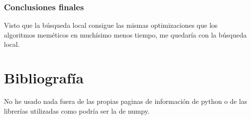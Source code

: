 \documentclass[titlepage]{article}
\begin{document}
	\subsubsection{Conclusiones finales}
	Visto que la búsqueda local consigue las mismas optimizaciones que los algoritmos meméticos en muchísimo menos tiempo, me quedaría con la búsqueda local. 
	
	
	
	
	
	
	\section{Bibliografía}
	No he usado nada fuera de las propias paginas de información de python o de las librerías utilizadas como podría ser la de numpy.
	
	\
  
\end{document}
